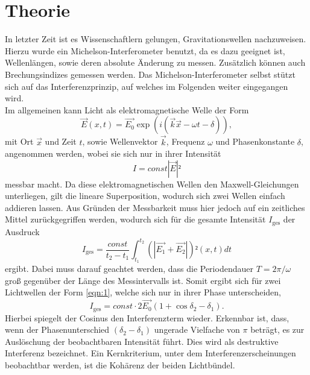 \section{Theorie}
\label{sec:Theorie}

In letzter Zeit ist es Wissenschaftlern gelungen, Gravitationswellen nachzuweisen.
Hierzu wurde ein Michelson-Interferometer benutzt, da es dazu geeignet ist, Wellenlängen, sowie deren absolute Änderung zu messen.
Zusätzlich können auch Brechungsindizes gemessen werden.
Das Michelson-Interferometer selbst stützt sich auf das Interferenzprinzip, auf welches im Folgenden weiter eingegangen wird.\\
Im allgemeinen kann Licht als elektromagnetische Welle der Form
\begin{equation}
  \vec{E}(x,t) = \vec{E_0}\exp{(i(\vec{k}\vec{x}-\omega t -\delta))}, \label{eqn:1}
\end{equation}
mit Ort $\vec{x}$ und Zeit $t$, sowie Wellenvektor $\vec{k}$, Frequenz $\omega$ und Phasenkonstante $\delta$, angenommen werden, wobei sie sich nur in ihrer Intensität
\begin{equation}
  I = const |\vec{E}|²
\end{equation}
messbar macht.
Da diese elektromagnetischen Wellen den Maxwell-Gleichungen unterliegen, gilt die lineare Superposition, wodurch sich zwei Wellen einfach addieren lassen.
Aus Gründen der Messbarkeit muss hier jedoch auf ein zeitliches Mittel zurückgegriffen werden, wodurch sich für die gesamte Intensität $I_{\text{ges}}$ der Ausdruck
\begin{equation}
  I_{\text{ges}} = \frac{const}{t_2-t_1} \int_{t_1}^{t_2} (|\vec{E_1}+\vec{E_2}|)²(x,t) dt
\end{equation}
ergibt. Dabei muss darauf geachtet werden, dass die Periodendauer $T = 2\pi/\omega$ groß gegenüber der Länge des Messintervalls ist.
Somit ergibt sich für zwei Lichtwellen der Form \ref{eqn:1}, welche sich nur in ihrer Phase unterscheiden,
\begin{equation}
  I_{\text{ges}} = const \cdot 2\vec{E_0}(1+\cos{\delta_2-\delta_1}).
\end{equation}
Hierbei spiegelt der Cosinus den Interferenzterm wieder.
Erkennbar ist, dass, wenn der Phasenunterschied $(\delta_2-\delta_1)$ ungerade Vielfache von $\pi$ beträgt, es zur Auslöschung der beobachtbaren Intensität führt.
Dies wird als destruktive Interferenz bezeichnet.
Ein Kernkriterium, unter dem Interferenzerscheinungen beobachtbar werden, ist die Kohärenz der beiden Lichtbündel.\\
